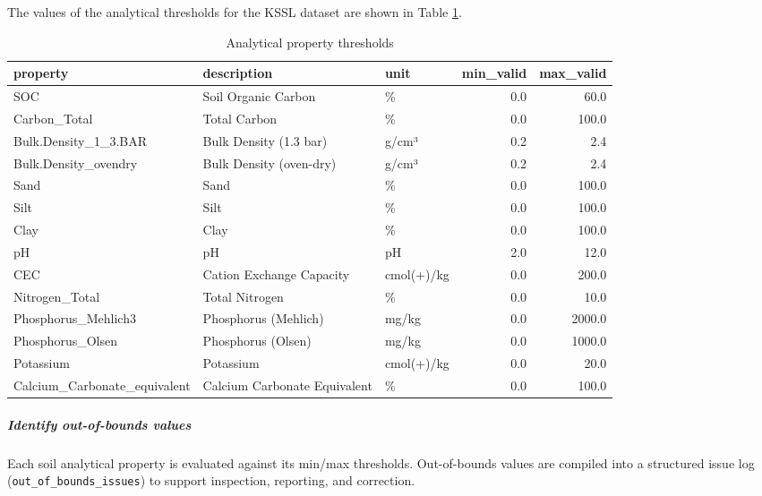 \documentclass[
  10pt,
  b5paper,
  oneside]{book}
\begin{document}
The values of the analytical thresholds for the KSSL dataset are shown in Table \ref{tab:thresholds-print}.

\begin{table}

\caption{\label{tab:thresholds-print}Analytical property thresholds}
\centering
\begin{tabular}[t]{l|l|l|r|r}
\hline
property & description & unit & min\_valid & max\_valid\\
\hline
SOC & Soil Organic Carbon & \% & 0.0 & 60.0\\
\hline
Carbon\_Total & Total Carbon & \% & 0.0 & 100.0\\
\hline
Bulk.Density\_1\_3.BAR & Bulk Density (1.3 bar) & g/cm³ & 0.2 & 2.4\\
\hline
Bulk.Density\_ovendry & Bulk Density (oven-dry) & g/cm³ & 0.2 & 2.4\\
\hline
Sand & Sand & \% & 0.0 & 100.0\\
\hline
Silt & Silt & \% & 0.0 & 100.0\\
\hline
Clay & Clay & \% & 0.0 & 100.0\\
\hline
pH & pH & pH & 2.0 & 12.0\\
\hline
CEC & Cation Exchange Capacity & cmol(+)/kg & 0.0 & 200.0\\
\hline
Nitrogen\_Total & Total Nitrogen & \% & 0.0 & 10.0\\
\hline
Phosphorus\_Mehlich3 & Phosphorus (Mehlich) & mg/kg & 0.0 & 2000.0\\
\hline
Phosphorus\_Olsen & Phosphorus (Olsen) & mg/kg & 0.0 & 1000.0\\
\hline
Potassium & Potassium & cmol(+)/kg & 0.0 & 20.0\\
\hline
Calcium\_Carbonate\_equivalent & Calcium Carbonate Equivalent & \% & 0.0 & 100.0\\
\hline
\end{tabular}
\end{table}

\subparagraph*{Identify out-of-bounds values}\label{identify-out-of-bounds-values}

Each soil analytical property is evaluated against its min/max thresholds. Out-of-bounds values are compiled into a structured issue log (\texttt{out\_of\_bounds\_issues}) to support inspection, reporting, and correction.
\end{document}
